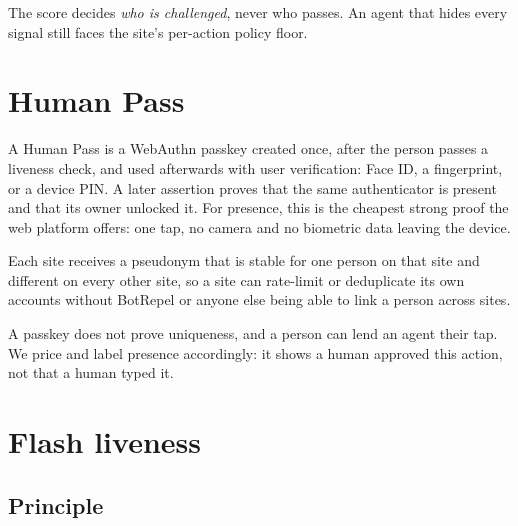 \documentclass[11pt]{article}
\begin{document}
The score decides \emph{who is challenged}, never who passes. An agent that hides every signal
still faces the site's per-action policy floor.

\section{Human Pass}

A Human Pass is a WebAuthn passkey created once, after the person passes a liveness check, and
used afterwards with user verification: Face ID, a fingerprint, or a device PIN. A later
assertion proves that the same authenticator is present and that its owner unlocked it. For
\textsf{presence}, this is the cheapest strong proof the web platform offers: one tap, no camera
and no biometric data leaving the device.

Each site receives a pseudonym that is stable for one person on that site and different on every
other site, so a site can rate-limit or deduplicate its own accounts without BotRepel or anyone
else being able to link a person across sites.

A passkey does not prove uniqueness, and a person can lend an agent their tap. We price and label
\textsf{presence} accordingly: it shows a human approved this action, not that a human typed it.

\section{Flash liveness}

\subsection{Principle}
\end{document}
